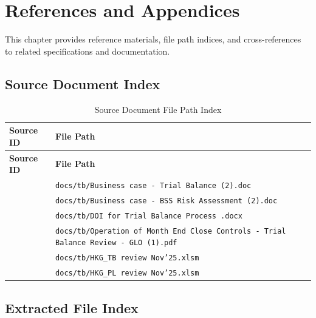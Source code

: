 \chapter{References and Appendices}
\label{ch:references}

This chapter provides reference materials, file path indices, and
cross-references to related specifications and documentation.

\section{Source Document Index}
\label{sec:source-doc-index}

\begin{longtable}{@{}L{2.5cm}L{11cm}@{}}
\caption{Source Document File Path Index}
\label{tab:source-doc-index} \\
\toprule
\textbf{Source ID} & \textbf{File Path} \\
\midrule
\endfirsthead
\toprule
\textbf{Source ID} & \textbf{File Path} \\
\midrule
\endhead
{} & \texttt{docs/tb/Business case - Trial Balance (2).doc} \\
 & \texttt{docs/tb/Business case - BSS Risk Assessment (2).doc} \\
 & \texttt{docs/tb/DOI for Trial Balance Process .docx} \\
 & \texttt{docs/tb/Operation of Month End Close Controls - Trial Balance Review - GLO (1).pdf} \\
 & \texttt{docs/tb/HKG\_TB review Nov'25.xlsm} \\
 & \texttt{docs/tb/HKG\_PL review Nov'25.xlsm} \\
\bottomrule
\end{longtable}

\section{Extracted File Index}
\label{sec:extracted-file-index}

